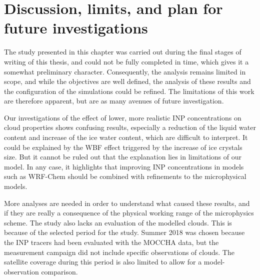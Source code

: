 

\section{Discussion, limits, and plan for future investigations}
The study presented in this chapter was carried out during the final stages of writing of this thesis, and could not be fully completed in time, which gives it a somewhat preliminary character.
Consequently, the analysis remains limited in scope, and while the objectives are well defined, the analysis of these results and the configuration of the simulations could be refined.
The limitations of this work are therefore apparent, but are as many avenues of future investigation.

Our investigations of the effect of lower, more realistic INP concentrations on cloud properties shows confusing results, especially a reduction of the liquid water content and increase of the ice water content, which are difficult to interpret. 
It could be explained by the WBF effect triggered by the increase of ice crystals size.
But it cannot be ruled out that the explanation lies in limitations of our model.
In any case, it highlights that improving INP concentrations in models such as WRF-Chem should be combined with refinements to the microphysical models.

More analyses are needed in order to understand what caused these results, and if they are really a consequence of the physical working range of the microphysics scheme.
The study also lacks an evaluation of the modelled clouds. This is because of the selected period for the study. Summer 2018 was chosen because the INP tracers had been evaluated with the MOCCHA data, but the measurement campaign did not include specific observations of clouds. The satellite coverage during this period is also limited to allow for a model-observation comparison. %
\vspace{\baselineskip}

